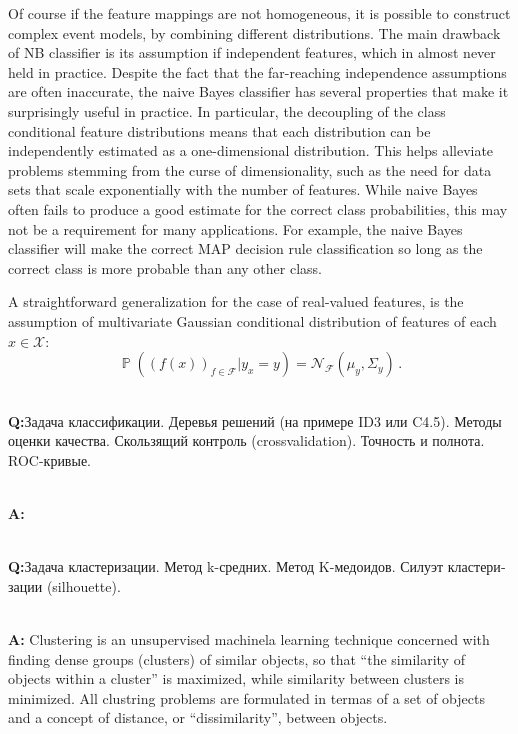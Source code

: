 \documentclass[a4paper]{article}
\newcommand{\Fcal}{\mathcal{F}}
\newcommand{\Ncal}{\mathcal{N}}
\newcommand{\Xcal}{\mathcal{X}}
\newcommand{\pr}{\mathop{\mathbb{P}}\nolimits}
\newcommand{\rus}[1]{\foreignlanguage{russian}{#1}}
\begin{document}

Of course if the feature mappings are not homogeneous, it is possible to construct
complex event models, by combining different distributions. The main drawback of
NB classifier is its assumption if independent features, which in almost never held
in practice. Despite the fact that the far-reaching independence assumptions are
often inaccurate, the naive Bayes classifier has several properties that make it
surprisingly useful in practice. In particular, the decoupling of the class conditional
feature distributions means that each distribution can be independently estimated
as a one-dimensional distribution. This helps alleviate problems stemming from the
curse of dimensionality, such as the need for data sets that scale exponentially
with the number of features. While naive Bayes often fails to produce a good estimate
for the correct class probabilities, this may not be a requirement for many applications.
For example, the naive Bayes classifier will make the correct MAP decision rule
classification so long as the correct class is more probable than any other class.

A straightforward generalization for the case of real-valued features, is the assumption
of multivariate Gaussian conditional distribution of features of each $x\in \Xcal$:
$$ \pr((f(x))_{f\in \Fcal}| y_x=y) = \Ncal_\Fcal(\mu_y, \Sigma_y) \,. $$

\hfill\\\textbf{Q:}\rus{Задача классификации. Деревья решений (на примере ID3 или
C4.5). Методы оценки качества. Скользящий контроль (crossvalidation). Точность и
полнота. ROC-кривые.}

\hfill\\\textbf{A:}

\hfill\\\textbf{Q:}\rus{Задача кластеризации. Метод k-средних. Метод K-медоидов.
Силуэт кластеризации (silhouette).}

\hfill\\\textbf{A:}
Clustering is an unsupervised machinela learning technique concerned with finding
dense groups (clusters) of similar objects, so that ``the similarity of objects
within a cluster'' is maximized, while similarity between clusters is minimized.
All clustring problems are formulated in termas of a set of objects and a concept
of distance, or ``dissimilarity'', between objects.
\end{document}
